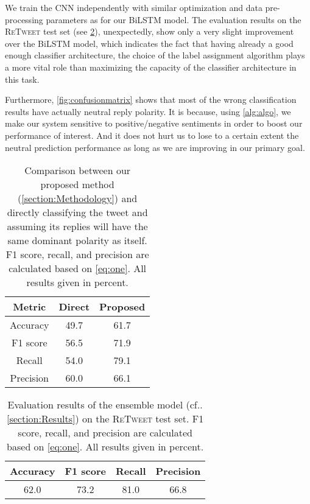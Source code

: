 \documentclass[conference]{IEEEtran}
\makeatletter
\DeclareRobustCommand\onedot{\futurelet\@let@token\@onedot}
\def\@onedot{\ifx\@let@token.\else.\null\fi\xspace}
\newcommand{\cf}{cf\onedot}
\newcommand{\retweet}{\textsc{ReTweet}\xspace}
\makeatother
\begin{document}
We train the CNN independently with similar optimization and data pre-processing parameters as for our BiLSTM model. 
The evaluation results on the \retweet test set (see \cref{tab:ensemble}), unexpectedly, show only a very slight improvement over the BiLSTM model, which indicates the fact that having already a good enough classifier architecture, the choice of the label assignment algorithm plays a more vital role than maximizing the capacity of the classifier architecture in this task.




Furthermore,
\cref{fig:confusionmatrix} shows that most of the wrong classification results have actually neutral reply polarity. 
It is because, using \cref{alg:algo}, we make our system sensitive to positive/negative sentiments in order to boost our performance of interest. 
And it does not hurt us to lose to a certain extent the neutral prediction performance as long as we are improving in our primary goal. 



\begin{table}[t]
\centering
\caption{Comparison between our proposed method (\cref{section:Methodology}) and directly classifying the tweet and assuming its replies will have the same dominant polarity as itself. F1 score, recall, and precision are calculated based on \cref{eq:one}. All results given in percent.}
\label{tab:part1vs2}
\begin{tabular}[b]{ccc} \hline
\toprule
\textbf{Metric} & \textbf{Direct} & \textbf{Proposed} \\
\midrule
Accuracy & 49.7 & 61.7 \\
F1 score & 56.5 & 71.9 \\
Recall & 54.0 & 79.1 \\
Precision & 60.0 & 66.1 \\
\bottomrule
\end{tabular}
\end{table}



\begin{table}[t]
\centering
\caption{Evaluation results of the ensemble model (\cf\cref{section:Results}) on the \retweet test set. F1 score, recall, and precision are calculated based on \cref{eq:one}. All results given in percent.}
\label{tab:ensemble}
\begin{tabular}{cccc} 
\toprule
\textbf{Accuracy} & \textbf{F1 score} & \textbf{Recall} & \textbf{Precision} \\
\midrule
62.0 & 73.2 & 81.0 & 66.8 \\
\bottomrule
\end{tabular}
\end{table}
\end{document}

